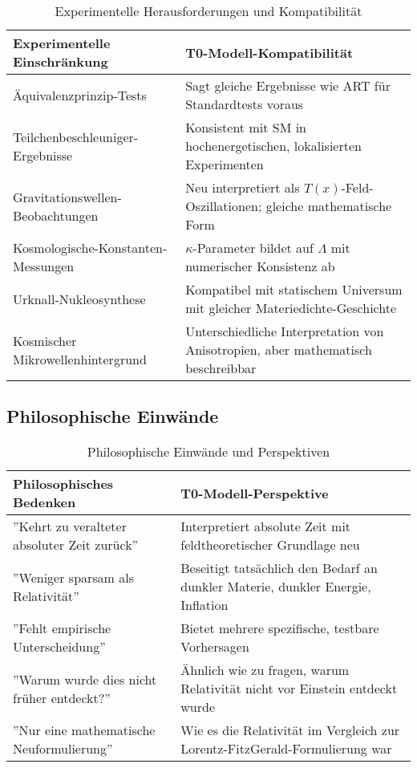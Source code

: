 \documentclass[12pt,a4paper]{article}
\newcommand{\Tfield}{T(x)}
\begin{document}
	\begin{table}[h]
		\centering
		\begin{tabular}{>{\RaggedRight}p{} >{\RaggedRight}p{}}
			\toprule
			\textbf{Experimentelle Einschränkung} & \textbf{T0-Modell-Kompatibilität} \\
			\midrule
			Äquivalenzprinzip-Tests & Sagt gleiche Ergebnisse wie ART für Standardtests voraus \\
			Teilchenbeschleuniger-Ergebnisse & Konsistent mit SM in hochenergetischen, lokalisierten Experimenten \\
			Gravitationswellen-Beobachtungen & Neu interpretiert als $\Tfield$-Feld-Oszillationen; gleiche mathematische Form \\
			Kosmologische-Konstanten-Messungen & $\kappa$-Parameter bildet auf $\Lambda$ mit numerischer Konsistenz ab \\
			Urknall-Nukleosynthese & Kompatibel mit statischem Universum mit gleicher Materiedichte-Geschichte \\
			Kosmischer Mikrowellenhintergrund & Unterschiedliche Interpretation von Anisotropien, aber mathematisch beschreibbar \\
			\bottomrule
		\end{tabular}
		\caption{Experimentelle Herausforderungen und Kompatibilität}
	\end{table}
	
	\subsection{Philosophische Einwände}
	
	\begin{table}[h]
		\centering
		\begin{tabular}{>{\RaggedRight}p{} >{\RaggedRight}p{}}
			\toprule
			\textbf{Philosophisches Bedenken} & \textbf{T0-Modell-Perspektive} \\
			\midrule
			''Kehrt zu veralteter absoluter Zeit zurück'' & Interpretiert absolute Zeit mit feldtheoretischer Grundlage neu \\
			''Weniger sparsam als Relativität'' & Beseitigt tatsächlich den Bedarf an dunkler Materie, dunkler Energie, Inflation \\
			''Fehlt empirische Unterscheidung'' & Bietet mehrere spezifische, testbare Vorhersagen \\
			''Warum wurde dies nicht früher entdeckt?'' & Ähnlich wie zu fragen, warum Relativität nicht vor Einstein entdeckt wurde \\
			''Nur eine mathematische Neuformulierung'' & Wie es die Relativität im Vergleich zur Lorentz-FitzGerald-Formulierung war \\
			\bottomrule
		\end{tabular}
		\caption{Philosophische Einwände und Perspektiven}
	\end{table}
	
\end{document}
